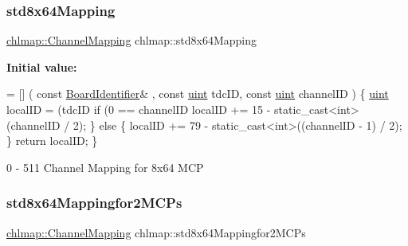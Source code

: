 \subsubsection{\texorpdfstring{std8x64\+Mapping}{std8x64Mapping}}
{\footnotesize\ttfamily \hyperlink{namespacechlmap_a5bb86fec567a6f1a0646881a9284bb01}{chlmap\+::\+Channel\+Mapping} chlmap\+::std8x64\+Mapping}

{\bfseries Initial value\+:}
\begin{DoxyCode}
= [] (
    \textcolor{keyword}{const} \hyperlink{class_board_identifier}{BoardIdentifier}& ,
    \textcolor{keyword}{const} \hyperlink{_packet_8cpp_a69aa29b598b851b0640aa225a9e5d61d}{uint} tdcID,
    \textcolor{keyword}{const} \hyperlink{_packet_8cpp_a69aa29b598b851b0640aa225a9e5d61d}{uint} channelID
) \{
    \hyperlink{_packet_8cpp_a69aa29b598b851b0640aa225a9e5d61d}{uint} localID = (tdcID%
    \textcolor{keywordflow}{if} (0 == channelID%
        localID += 15 - \textcolor{keyword}{static\_cast<}\textcolor{keywordtype}{int}\textcolor{keyword}{>}(channelID / 2); 
    \} \textcolor{keywordflow}{else} \{
        localID += 79 - \textcolor{keyword}{static\_cast<}\textcolor{keywordtype}{int}\textcolor{keyword}{>}((channelID - 1) / 2); 
    \}
    \textcolor{keywordflow}{return} localID;
\}
\end{DoxyCode}


0 -\/ 511 Channel Mapping for 8x64 M\+CP 

\mbox{\label{namespacechlmap_ae2a84ef16a6ad086ad62d389f29fd63a}} 
\subsubsection{\texorpdfstring{std8x64\+Mappingfor2\+M\+C\+Ps}{std8x64Mappingfor2MCPs}}
{\footnotesize\ttfamily \hyperlink{namespacechlmap_a5bb86fec567a6f1a0646881a9284bb01}{chlmap\+::\+Channel\+Mapping} chlmap\+::std8x64\+Mappingfor2\+M\+C\+Ps}

